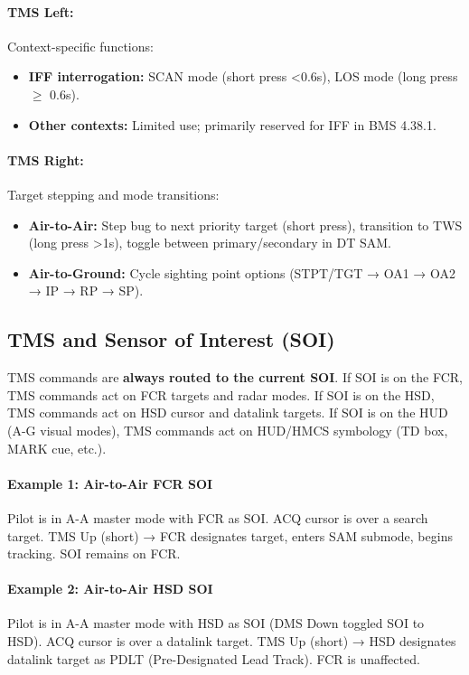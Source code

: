 \documentclass[11pt, a4paper, twoside]{report}
\begin{document}
\paragraph{TMS Left:}
Context-specific functions:
\begin{itemize}
    \item \textbf{IFF interrogation:} SCAN mode (short press <0.6s), LOS mode (long press $\geq$ 0.6s).
    \item \textbf{Other contexts:} Limited use; primarily reserved for IFF in BMS 4.38.1.
\end{itemize}

\paragraph{TMS Right:}
Target stepping and mode transitions:
\begin{itemize}
    \item \textbf{Air-to-Air:} Step bug to next priority target (short press), transition to TWS (long press >1s), toggle between primary/secondary in DT SAM.
    \item \textbf{Air-to-Ground:} Cycle sighting point options (STPT/TGT → OA1 → OA2 → IP → RP → SP).
\end{itemize}

\subsection{TMS and Sensor of Interest (SOI)}
\label{sec:C3-S1-S3}

TMS commands are \textbf{always routed to the current SOI}. If SOI is on the FCR, TMS commands act on FCR targets and radar modes. If SOI is on the HSD, TMS commands act on HSD cursor and datalink targets. If SOI is on the HUD (A-G visual modes), TMS commands act on HUD/HMCS symbology (TD box, MARK cue, etc.).

\paragraph{Example 1: Air-to-Air FCR SOI}
Pilot is in A-A master mode with FCR as SOI. ACQ cursor is over a search target. TMS Up (short) → FCR designates target, enters SAM submode, begins tracking. SOI remains on FCR.

\paragraph{Example 2: Air-to-Air HSD SOI}
Pilot is in A-A master mode with HSD as SOI (DMS Down toggled SOI to HSD). ACQ cursor is over a datalink target. TMS Up (short) → HSD designates datalink target as PDLT (Pre-Designated Lead Track). FCR is unaffected.
\end{document}

